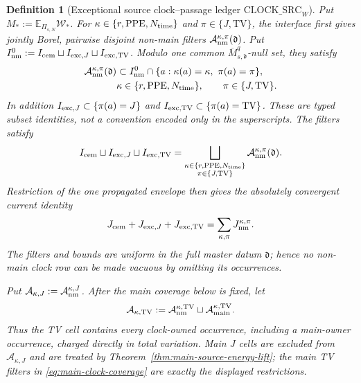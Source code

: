 \documentclass[11pt]{article}
\newtheorem{definition}[theorem]{Definition}
\begin{document}
\begin{definition}[Exceptional source clock--passage ledger
$\mathrm{CLOCK\_SRC}_{W}$]
\label{def:source-clock-matrix}
Put $M_*:=\mathbb E_{\Pi_{s,N}}\mathscr W_*$.  For
$\kappa\in\{r,\mathrm{PPE},N_{\rm time}\}$ and
$\pi\in\{J,\mathrm{TV}\}$, the interface first gives jointly Borel,
pairwise disjoint non-main filters
$\mathcal A_{\rm nm}^{\kappa,\pi}(\mathfrak d)$.  Put
$I_{\rm nm}^0:=I_{\rm cem}\sqcup I_{{\rm exc},J}
                    \sqcup I_{{\rm exc},\rm TV}$.  Modulo one common
$\overline M_{s,\mathfrak d}^{q}$-null set, they satisfy
\begin{equation}
\label{eq:nonmain-clock-record-compatibility}
 \begin{aligned}
 \mathcal A_{\rm nm}^{\kappa,\pi}(\mathfrak d)
 &\subset I_{\rm nm}^0
       \cap\{a:\kappa(a)=\kappa,\ \pi(a)=\pi\},\\
 &\kappa\in\{r,{\rm PPE},N_{\rm time}\},
 \qquad \pi\in\{J,{\rm TV}\}.
 \end{aligned}
\end{equation}
In addition $I_{{\rm exc},J}\subset\{\pi(a)=J\}$ and
$I_{{\rm exc},\rm TV}\subset\{\pi(a)=\mathrm{TV}\}$.  These are typed
subset identities, not a convention encoded only in the superscripts.
The filters satisfy
\begin{equation}
\label{eq:nonmain-clock-coverage}
 I_{\rm cem}\sqcup I_{{\rm exc},J}\sqcup I_{{\rm exc},\rm TV}
 =\bigsqcup_{\substack{
       \kappa\in\{r,{\rm PPE},N_{\rm time}\}\\
       \pi\in\{J,{\rm TV}\}}}
       \mathcal A_{\rm nm}^{\kappa,\pi}(\mathfrak d).
\end{equation}
Restriction of the one propagated envelope then gives the absolutely
convergent current identity
\begin{equation}
\label{eq:nonmain-clock-current-identity}
 J_{\rm cem}+J_{{\rm exc},J}+J_{{\rm exc},\rm TV}
 =\sum_{\kappa,\pi}J_{\rm nm}^{\kappa,\pi}.
\end{equation}
The filters and bounds are uniform in the full master datum
$\mathfrak d$; hence no non-main clock row can be made vacuous by omitting
its occurrences.

Put $\mathcal A_{\kappa,J}:=\mathcal A_{\rm nm}^{\kappa,J}$.
After the main coverage below is fixed, let
\[
 \mathcal A_{\kappa,\rm TV}:=
 \mathcal A_{\rm nm}^{\kappa,\rm TV}
 \sqcup\mathcal A_{\rm main}^{\kappa,\rm TV}.
\]
Thus the TV cell contains \emph{every} clock-owned occurrence, including a
main-owner occurrence, charged directly in total variation.  Main $J$ cells
are excluded from $\mathcal A_{\kappa,J}$ and are treated by
Theorem~\ref{thm:main-source-energy-lift}; the main TV filters in
\eqref{eq:main-clock-coverage} are exactly the displayed restrictions.


\end{definition}
\end{document}
